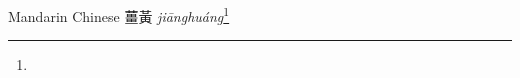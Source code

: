\begin{etymology}\label{ety:jianghuang}
Mandarin Chinese {薑黃} \textit{jiānghuáng}\footnote{}
\end{etymology}